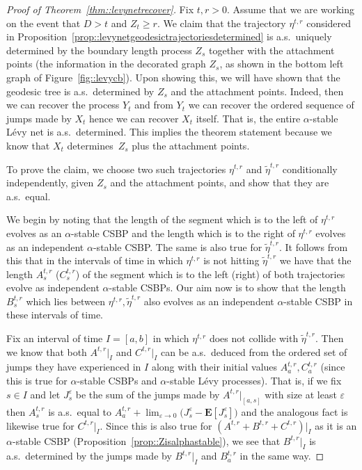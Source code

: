 \documentclass[10pt]{amsart}
\let\epsilon\varepsilon
\theoremstyle{plain}
\numberwithin{theorem}{section}
\theoremstyle{definition}
\newcommand \E {{\mathbf E}}
\let\wt\widetilde
\begin{document}
\begin{proof}[Proof of Theorem~\ref{thm::levynetrecover}]
Fix $t, r > 0$. Assume that we are working on the event that $D > t$ and $Z_t \geq r$. We claim that the trajectory $\eta^{t,r}$ considered in Proposition~\ref{prop::levynetgeodesictrajectoriesdetermined} is a.s.\ uniquely determined by the boundary length process $Z_s$ together with the attachment points (\ie the information in the decorated graph $Z_s$, as shown in the bottom left graph of Figure~\ref{fig::levycb}). Upon showing this, we will have shown that the geodesic tree is a.s.\ determined by $Z_s$ and the attachment points. Indeed, then we can recover the process $Y_t$ and from $Y_t$ we can recover the ordered sequence of jumps made by $X_t$ hence we can recover $X_t$ itself. That is, the entire $\alpha$-stable Lévy net is a.s.\ determined. This implies the theorem statement because we know that $X_t$ determines~$Z_s$ plus the attachment points.

To prove the claim, we choose two such trajectories $\eta^{t,r}$ and $\wt{\eta}^{t,r}$ conditionally independently, given $Z_s$ and the attachment points, and show that they are a.s.\ equal.

We begin by noting that the length of the segment which is to the left of $\eta^{t,r}$ evolves as an $\alpha$-stable CSBP and the length which is to the right of $\eta^{t,r}$ evolves as an independent $\alpha$-stable CSBP. The same is also true for $\wt{\eta}^{t,r}$. It follows from this that in the intervals of time in which $\eta^{t,r}$ is not hitting $\wt{\eta}^{t,r}$ we have that the length $A_s^{t,r}$ (\resp $C_s^{t,r}$) of the segment which is to the left (\resp right) of both trajectories evolve as independent $\alpha$-stable CSBPs. Our aim now is to show that the length $B_s^{t,r}$ which lies between $\eta^{t,r}, \wt{\eta}^{t,r}$ also evolves as an independent $\alpha$-stable CSBP in these intervals of time.

Fix an interval of time $I = [a,b]$ in which $\eta^{t,r}$ does not collide with $\wt{\eta}^{t,r}$. Then we know that both $A^{t,r}|_I$ and $C^{t,r}|_I$ can be a.s.\ deduced from the ordered set of jumps they have experienced in $I$ along with their initial values $A_a^{t,r},C_a^{t,r}$ (since this is true for $\alpha$-stable CSBPs and $\alpha$-stable Lévy processes). That is, if we fix $s \in I$ and let $J_s^\epsilon$ be the sum of the jumps made by $A^{t,r}|_{[a,s]}$ with size at least $\epsilon$ then $A_s^{t,r}$ is a.s.\ equal to $A_a^{t,r} + \lim_{\epsilon \to 0} \big( J_s^\epsilon - \E[ J_s^\epsilon] \big)$ and the analogous fact is likewise true for $C^{t,r}|_I$. Since this is also true for $(A^{t,r} + B^{t,r} + C^{t,r})|_I$ as it is an $\alpha$-stable CSBP (Proposition~\ref{prop::Zisalphastable}), we see that $B^{t,r}|_I$ is a.s.\ determined by the jumps made by $B^{t,r}|_I$ and $B_a^{t,r}$ in the same way.


\end{proof}
\end{document}
